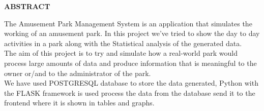\pagestyle{empty}
\begin{center}
\textup{\large{\textbf{ABSTRACT}}}
\end{center}

\justify
\indent
The Amusement Park Management System is an application that simulates the working of an amusement park. In this project we've tried to show the day to day activities in a park along with the Statistical analysis of the generated data.\\

The aim of this project is to try and simulate how a real-world park would process large amounts of data and produce information that is meaningful to the owner or/and to the administrator of the park.\\

We have used POSTGRESQL database to store the data generated, Python with the FLASK framework is used process the data from the database send it to the frontend where it is shown in tables and graphs.
\pagebreak
